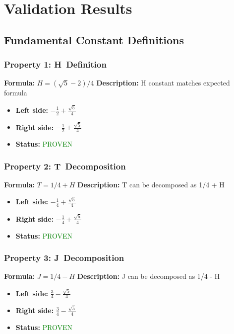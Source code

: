 \section{Validation Results}

\subsection{Fundamental Constant Definitions}

\subsubsection*{Property 1: H~Definition}
\textbf{Formula:} $H = (\sqrt{5} - 2)/4$
\textbf{Description:} H constant matches expected formula

\begin{itemize}
\item \textbf{Left side:} $- \frac{1}{2} + \frac{\sqrt{5}}{4}$
\item \textbf{Right side:} $- \frac{1}{2} + \frac{\sqrt{5}}{4}$
\item \textbf{Status:} \textcolor{green}{PROVEN}
\end{itemize}

\subsubsection*{Property 2: T~Decomposition}
\textbf{Formula:} $T = 1/4 + H$
\textbf{Description:} T can be decomposed as 1/4 + H

\begin{itemize}
\item \textbf{Left side:} $- \frac{1}{4} + \frac{\sqrt{5}}{4}$
\item \textbf{Right side:} $- \frac{1}{4} + \frac{\sqrt{5}}{4}$
\item \textbf{Status:} \textcolor{green}{PROVEN}
\end{itemize}

\subsubsection*{Property 3: J~Decomposition}
\textbf{Formula:} $J = 1/4 - H$
\textbf{Description:} J can be decomposed as 1/4 - H

\begin{itemize}
\item \textbf{Left side:} $\frac{3}{4} - \frac{\sqrt{5}}{4}$
\item \textbf{Right side:} $\frac{3}{4} - \frac{\sqrt{5}}{4}$
\item \textbf{Status:} \textcolor{green}{PROVEN}
\end{itemize}

